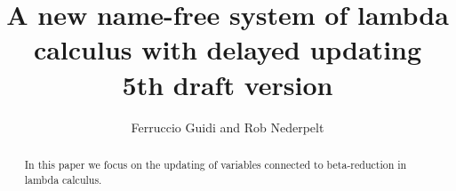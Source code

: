 \documentclass{article}
\theoremstyle{plain}
\theoremstyle{definition}
\begin{document}
\title{\bf {A new name-free system of lambda calculus with delayed updating}\\ {\small 5th draft version}}
\author{Ferruccio Guidi and Rob Nederpelt}
\maketitle
\begin{abstract}
In this paper we focus on the updating of variables connected to beta-reduction in lambda calculus.
\end{abstract}


%







\end{document}
